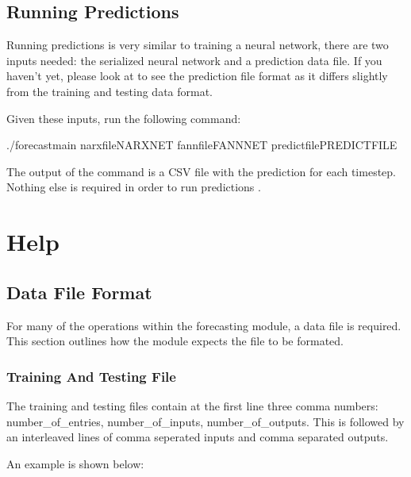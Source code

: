 \documentclass[letterpaper,10pt,english]{sphinxmanual}
\begin{document}
\section{Running Predictions}
\label{\detokenize{usage:running-predictions}}
Running predictions is very similar to training a neural network, there are two inputs
needed: the serialized neural network and a prediction data file. If you haven't yet, please look
at {\hyperref[\detokenize{help::doc}]{}} to see the prediction file format as it differs slightly from the training and
testing data format.

Given these inputs, run the following command:

\begin{sphinxVerbatim}[commandchars=\\\{\}]
./forecast\PYGZhy{}main \PYGZhy{}\PYGZhy{}narx\PYGZhy{}fileNARXNET \PYGZhy{}\PYGZhy{}fann\PYGZhy{}fileFANNNET \PYGZhy{}\PYGZhy{}predict\PYGZhy{}filePREDICT\PYGZus{}FILE
\end{sphinxVerbatim}

The output of the command is a CSV file with the prediction for each timestep. Nothing else
is required in order to run predictions .


\chapter{Help}
\label{\detokenize{help::doc}}\label{\detokenize{help:help}}\label{\detokenize{help:id1}}

\section{Data File Format}
\label{\detokenize{help:data-file-format}}
For many of the operations within the forecasting module, a data file is required.
This section outlines how the module expects the file to be formated.


\subsection{Training And Testing File}
\label{\detokenize{help:training-and-testing-file}}
The training and testing files contain at the first line three comma
numbers: number\_of\_entries, number\_of\_inputs, number\_of\_outputs. This is followed
by an interleaved lines of comma seperated inputs and comma separated outputs.

An example is shown below:
\end{document}
